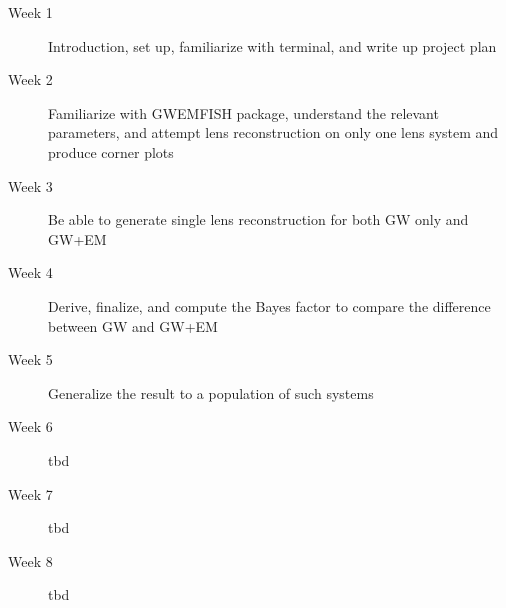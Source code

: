 \documentclass[pdflatex,sn-mathphys-num]{sn-jnl}%
\theoremstyle{thmstyleone}%
\theoremstyle{thmstyletwo}%
\theoremstyle{thmstylethree}%
\begin{document}
\begin{description}
	\item[Week 1] Introduction, set up, familiarize with terminal, and write up project plan
	\item[Week 2] Familiarize with GWEMFISH package, understand the relevant parameters, and attempt lens reconstruction on only one lens system and produce corner plots
	\item[Week 3] Be able to generate single lens reconstruction for both GW only and GW+EM
	\item[Week 4] Derive, finalize, and compute the Bayes factor to compare the difference between GW and GW+EM
	\item[Week 5] Generalize the result to a population of such systems
	\item[Week 6] tbd
	\item[Week 7] tbd
	\item[Week 8] tbd
\end{description}

\end{document}
